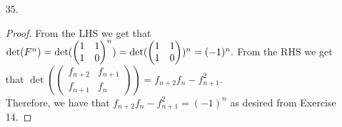 \documentclass[11pt]{article}
\theoremstyle{definition}
\newcommand{\Z}{\mathbb{Z}}
\begin{document}
\begin{enumerate}
    \begin{proof}
    We will proceed by mathematical induction.\\
    Base Case: Consider when $n=1,$ then it holds that $F^n = \begin{pmatrix}
    f_2 & f_1\\
    f_1 & f_0
    \end{pmatrix} =
    \begin{pmatrix}
    1 & 1\\
    1 & 0
    \end{pmatrix}$.\\
    Inductive Step: Assume the equality holds for $n=k$, that is to say that $F^k =
    \begin{pmatrix}
    f_{k+1} & f_k\\
    f_k & f_{k-1}
    \end{pmatrix}.$ Then we want to show that the equality is true for $n=k+1.$ By matrix multiplication we have that $F^{k+1} = F^k*F =
    \begin{pmatrix}
    f_{k+1} & f_k\\
    f_k & f_{k-1}
    \end{pmatrix}*
    \begin{pmatrix}
    1 & 1\\
    1 & 0
    \end{pmatrix} = 
    \begin{pmatrix}
    f_{k+1}+f_k & f_{k+1}\\
    f_{k+1} & f_k
    \end{pmatrix} = 
    \begin{pmatrix}
    f_{k+2} & f_{k+1}\\
    f_{k+1} & f_k
    \end{pmatrix}.$ This shows that the equality holds for $n=k+1.$ Therefore, since $n = k$ is true implies that $n = k+1$ is true, the equality is true for all $n \in \Z^+$ by mathematical induction.
    \end{proof}
    
    \newpage
    \item [35. ]
    
    \begin{proof}
    From the LHS we get that $\det(F^n) = \det(
    \begin{pmatrix}
    1 & 1\\
    1 & 0
    \end{pmatrix}^n) = \det(
    \begin{pmatrix}
    1 & 1\\
    1 & 0 
    \end{pmatrix})^n = (-1)^n.\\$
    From the RHS we get that $\det(
    \begin{pmatrix}
    f_{n+2} & f_{n+1}\\
    f_{n+1} & f_n
    \end{pmatrix}) = f_{n+2}f_n - f_{n+1}^2.$\\
    Therefore, we have that $f_{n+2}f_n - f_{n+1}^2 = (-1)^n$ as desired from Exercise 14.
    \end{proof}
    

\end{enumerate}
\end{document}
